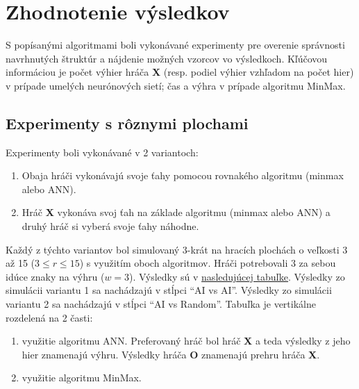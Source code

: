 \section{Zhodnotenie výsledkov}\label{sec:experiments}
S popísanými algoritmami boli vykonávané experimenty pre overenie správnosti navrhnutých štruktúr a nájdenie možných
vzorcov vo výsledkoch.
Kľúčovou informáciou je počet výhier hráča \textbf{X} (resp. podiel výhier vzhľadom na počet hier) v prípade
umelých neurónových sietí; čas a výhra v prípade algoritmu MinMax.

\subsection{Experimenty s rôznymi plochami}\label{subsec:experiments-board}

Experimenty boli vykonávané v 2 variantoch:
\begin{enumerate}
    \item Obaja hráči vykonávajú svoje ťahy pomocou rovnakého algoritmu (minmax alebo ANN).
    \item Hráč \textbf{X} vykonáva svoj ťah na základe algoritmu (minmax alebo ANN) a druhý hráč si vyberá svoje ťahy náhodne.
\end{enumerate}
Každý z týchto variantov bol simulovaný 3-krát na hracích plochách o veľkosti 3 až 15 ($3 \leq r \leq 15$) s využitím oboch algoritmov.
Hráči potrebovali 3 za sebou idúce znaky na výhru ($w = 3$).
Výsledky sú v \hyperref[table:experiments-boards]{nasledujúcej tabuľke}.
Výsledky zo simulácii variantu 1 sa nachádzajú v stĺpci \enquote{AI vs AI}.
Výsledky zo simulácii variantu 2 sa nachádzajú v stĺpci \enquote{AI vs Random}.
Tabuľka je vertikálne rozdelená na 2 časti:
\begin{enumerate}
    \item využitie algoritmu ANN.
    Preferovaný hráč bol hráč \textbf{X} a teda výsledky z jeho hier znamenajú výhru.
    Výsledky hráča \textbf{O} znamenajú prehru hráča \textbf{X}.
    \item využitie algoritmu MinMax.
\end{enumerate}


